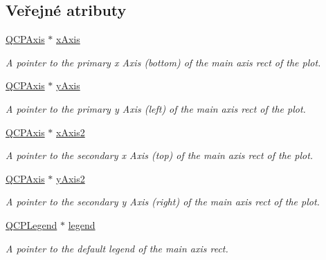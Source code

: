 \subsection*{Veřejné atributy}
\begin{DoxyCompactItemize}
\item 
\hyperlink{classQCPAxis}{Q\+C\+P\+Axis} $\ast$ \hyperlink{classQCustomPlot_a9a79cd0158a4c7f30cbc702f0fd800e4}{x\+Axis}
\begin{DoxyCompactList}\small\item\em A pointer to the primary x Axis (bottom) of the main axis rect of the plot. \end{DoxyCompactList}\item 
\hyperlink{classQCPAxis}{Q\+C\+P\+Axis} $\ast$ \hyperlink{classQCustomPlot_af6fea5679725b152c14facd920b19367}{y\+Axis}
\begin{DoxyCompactList}\small\item\em A pointer to the primary y Axis (left) of the main axis rect of the plot. \end{DoxyCompactList}\item 
\hyperlink{classQCPAxis}{Q\+C\+P\+Axis} $\ast$ \hyperlink{classQCustomPlot_ada41599f22cad901c030f3dcbdd82fd9}{x\+Axis2}
\begin{DoxyCompactList}\small\item\em A pointer to the secondary x Axis (top) of the main axis rect of the plot. \end{DoxyCompactList}\item 
\hyperlink{classQCPAxis}{Q\+C\+P\+Axis} $\ast$ \hyperlink{classQCustomPlot_af13fdc5bce7d0fabd640f13ba805c0b7}{y\+Axis2}
\begin{DoxyCompactList}\small\item\em A pointer to the secondary y Axis (right) of the main axis rect of the plot. \end{DoxyCompactList}\item 
\hyperlink{classQCPLegend}{Q\+C\+P\+Legend} $\ast$ \hyperlink{classQCustomPlot_a4eadcd237dc6a09938b68b16877fa6af}{legend}
\begin{DoxyCompactList}\small\item\em A pointer to the default legend of the main axis rect. \end{DoxyCompactList}\end{DoxyCompactItemize}
